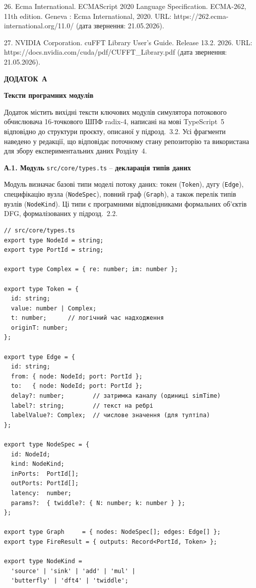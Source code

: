 \documentclass[
]{article}
\begin{document}
26. Ecma International. ECMAScript 2020 Language Specification.
ECMA-262, 11th edition. Geneva : Ecma International, 2020. URL:
https://262.ecma-international.org/11.0/ (дата звернення: 21.05.2026).

27. NVIDIA Corporation. cuFFT Library User's Guide. Release 13.2. 2026.
URL: https://docs.nvidia.com/cuda/pdf/CUFFT\_Library.pdf (дата
звернення: 21.05.2026).

\newpage
\protect{}\label{app:A}{}\textbf{ДОДАТОК~А}

\begin{center}
\textbf{Тексти програмних модулів}
\end{center}

Додаток містить вихідні тексти ключових модулів симулятора потокового
обчислювача 16-точкового ШПФ radix-4, написані на мові TypeScript~5
відповідно до структури проєкту, описаної у підрозд.~3.2. Усі фрагменти
наведено у редакції, що відповідає поточному стану репозиторію та
використана для збору експериментальних даних Розділу~4.

\textbf{А.1. Модуль} \texttt{src/core/types.ts} -- \textbf{декларація
типів даних}

Модуль визначає базові типи моделі потоку даних: токен (\texttt{Token}),
дугу (\texttt{Edge}), специфікацію вузла (\texttt{NodeSpec}), повний граф
(\texttt{Graph}), а також перелік типів вузлів (\texttt{NodeKind}). Ці
типи є програмними відповідниками формальних об'єктів DFG,
формалізованих у підрозд.~2.2.

\begin{verbatim}
// src/core/types.ts
export type NodeId = string;
export type PortId = string;

export type Complex = { re: number; im: number };

export type Token = {
  id: string;
  value: number | Complex;
  t: number;      // логічний час надходження
  originT: number;
};

export type Edge = {
  id: string;
  from: { node: NodeId; port: PortId };
  to:   { node: NodeId; port: PortId };
  delay?: number;        // затримка каналу (одиниці simTime)
  label?: string;        // текст на ребрі
  labelValue?: Complex;  // числове значення (для тултіпа)
};

export type NodeSpec = {
  id: NodeId;
  kind: NodeKind;
  inPorts:  PortId[];
  outPorts: PortId[];
  latency:  number;
  params?:  { twiddle?: { N: number; k: number } };
};

export type Graph     = { nodes: NodeSpec[]; edges: Edge[] };
export type FireResult = { outputs: Record<PortId, Token> };

export type NodeKind =
  'source' | 'sink' | 'add' | 'mul' |
  'butterfly' | 'dft4' | 'twiddle';
\end{verbatim}
\end{document}
